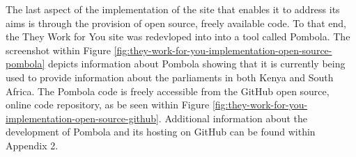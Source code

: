 The last aspect of the implementation of the site that enables it to address its aims is through the provision of open source, freely available code.
To that end, the They Work for You site was redevloped into into a tool called Pombola.
The screenshot within Figure \ref{fig:they-work-for-you-implementation-open-source-pombola} depicts information about Pombola showing that it is currently being used to provide information about the parliaments in both Kenya and South Africa.
The Pombola code \cite{mysociety-github} is freely accessible from the GitHub \cite{github} open source, online code repository, as be seen within Figure \ref{fig:they-work-for-you-implementation-open-source-github}.
Additional information about the development of Pombola and its hosting on GitHub can be found within Appendix 2.
